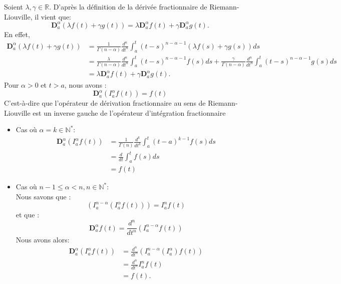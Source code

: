 Soient $\lambda, \gamma\in \mathbb{R}$. D'après la définition de la dérivée fractionnaire de Riemann-Liouville, il vient que:
\begin{equation}
    \textbf{D}_a^{\alpha}(\lambda f(t) + \gamma g(t)) = \lambda\textbf{D}_a^{\alpha} f(t) +\gamma\textbf{D}_a^{\alpha} g(t).
\end{equation}
En effet,
\begin{align*}
    \textbf{D}_a^{\alpha}(\lambda f(t) + \gamma g(t)) &=  \frac{1}{\Gamma(n-\alpha)} \frac{d^n}{dt^n}\int_a^t (t-s)^{n-\alpha-1}(\lambda f(s)+\gamma g(s))ds\\
    &= \frac{\lambda}{\Gamma(n-\alpha)} \frac{d^n}{dt^n}\int_a^t(t-s)^{n-\alpha-1}f(s) ds +\frac{\gamma}{\Gamma(n-\alpha)} \frac{d^n}{dt^n}\int_a^t(t-s)^{n-\alpha-1}g(s)ds\\
    &=\lambda \textbf{D}_a^{\alpha} f(t) +\gamma\textbf{D}_a^{\alpha} g(t).
\end{align*}
Pour $\alpha>0$ et $t>a$, nous avons :
\begin{equation}
    \textbf{D}_a^{\alpha}\left(I_a^{\alpha}f(t)\right) = f(t)
\end{equation}
C'est-à-dire que l'opérateur de dérivation fractionnaire au sens de Riemann-Liouville est un inverse gauche de l'opérateur d'intégration fractionnaire
\begin{itemize}
    \item Cas où $\alpha=k\in\mathbb{N^*}$:\\
    \begin{align*}
        \textbf{D}_a^{\alpha}\left(I_a^{\alpha}f(t)\right) &= \frac{1}{\Gamma(n)}\frac{d^k}{dt^k}\int_a^t (t-a)^{k-1} f(s) ds\\
        &=\frac{d}{dt}\int_a^tf(s)ds\\
        &=f(t)
    \end{align*}
    \item Cas où $n-1\leq \alpha<n,  n\in\mathbb{N^*}$:\\
    Nous savons que :
    \begin{equation*}
        \left(I_a^{n-\alpha}(I_a^{\alpha}f(t)) \right) = I_a^nf(t)
    \end{equation*}
    et que :
    \begin{equation*}
         \textbf{D}_a^{\alpha}f(t) =  \frac{d^n}{dt^n} \left(I_a^{n-\alpha} f(t)\right)
    \end{equation*}
    Nous avons alors:
    \begin{align*}
        \textbf{D}_a^{\alpha}\left(I_a^{\alpha} f(t)\right) &= \frac{d^n}{dt^n} \left(I_a^{n-\alpha}(I_a^{\alpha}) f(t)\right)\\
        &= \frac{d^n}{dt^n}I_a^nf(t)\\
        &= f(t).
    \end{align*}
\end{itemize}
